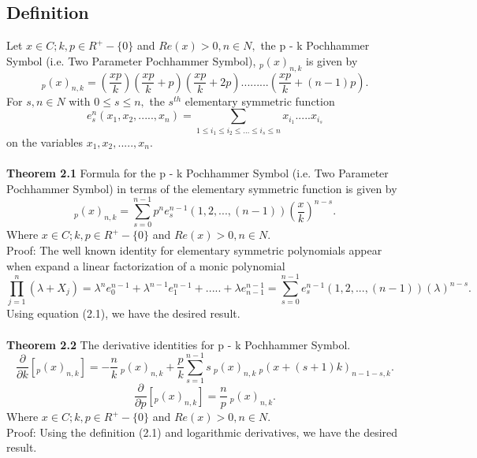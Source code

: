 \documentclass[11pt,a4paper]{article}
\numberwithin{equation}{section}
\begin{document}
\subsection{Definition}\label{1.1}
Let $ x\in C ;  k,p \in R^{+}-\lbrace 0 \rbrace $ and $ Re(x)>0, n\in N, $ the p - k Pochhammer Symbol (i.e. Two Parameter Pochhammer Symbol), $ _{p}(x)_{n,k} $ is given by 
\begin{equation}
_{p}(x)_{n,k}=(\frac{xp}{k})(\frac{xp}{k}+p)(\frac{xp}{k}+2p).........(\frac{xp}{k}+(n-1)p).
\end{equation}
For $ s,n \in N  $ with $ 0\leq s\leq n, $ the $ s^{th} $ elementary symmetric function 
\[e^{n}_{s}(x_{1},x_{2},.....,x_{n})= \sum_{{1\leq i_{1} \leq i_{2} \leq... \leq i_{s} \leq n}} x_{i_{1}}.....x_{i_{s}}\]
on the variables $ x_{1},x_{2},.....,x_{n}.$\\\\ 
\textbf{Theorem 2.1} Formula for the p - k Pochhammer Symbol (i.e. Two Parameter Pochhammer Symbol) in terms of the elementary symmetric function is given by 
\begin{equation}
_{p}(x)_{n,k}=\sum_{s=0}^{n-1}p^{n}e_{s}^{n-1}(1,2,...,(n-1))(\frac{x}{k})^{n-s}.
\end{equation}
Where $ x\in C ;  k,p \in R^{+}-\lbrace 0 \rbrace $ and $ Re(x)>0, n\in N. $\\
Proof: The well known identity for elementary symmetric polynomials appear when expand a linear factorization of a monic polynomial
\begin{equation}
\prod_{j=1}^{n}(\lambda + X_{j})= \lambda^{n}e_{0}^{n-1}+\lambda^{n-1}e_{1}^{n-1}+.....+\lambda e_{n-1}^{n-1} =\sum_{s=0}^{n-1}e_{s}^{n-1}(1,2,...,(n-1))(\lambda)^{n-s}.
\end{equation} 
Using equation (2.1), we have the desired result.\\\\
\textbf{Theorem 2.2} The derivative identities for p - k Pochhammer Symbol. 
\begin{equation}
\frac{\partial}{\partial k}[_{p}(x)_{n,k}]= -\frac{n}{k}\:_{p}(x)_{n,k} + \frac{p}{k}\sum_{s=1}^{n-1}s\:_{p}(x)_{n,k}\: _{p}(x+(s+1)k)_{n-1-s,k}.
\end{equation}
\begin{equation}
\frac{\partial}{\partial p}[_{p}(x)_{n,k}]= \frac{n}{p}\:_{p}(x)_{n,k}.
\end{equation}
Where $ x\in C ;  k,p \in R^{+}-\lbrace 0 \rbrace $ and $ Re(x)>0, n\in N. $\\
Proof: Using the definition (2.1) and logarithmic derivatives, we have the desired result.
\end{document}
